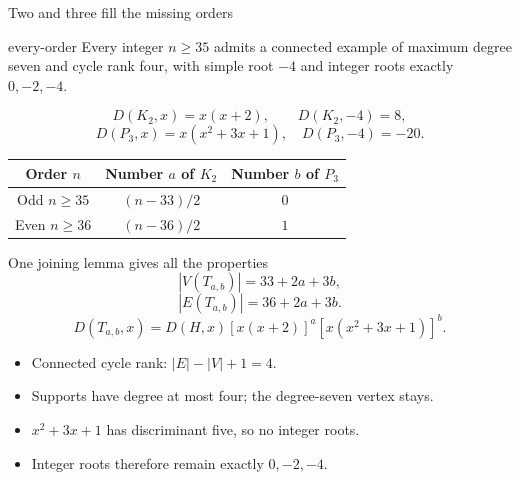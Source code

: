 \documentclass{beamer}
\begin{document}
\begin{frame}{Two and three fill the missing orders}
\begin{bookresult}{every-order}
Every integer $n\geq35$ admits a connected example of maximum degree seven and cycle rank four, with simple root $-4$ and integer roots exactly $0,-2,-4$.
\end{bookresult}
\[D(K_2,x)=x(x+2),\qquad D(K_2,-4)=8,\]
\[D(P_3,x)=x(x^2+3x+1),\quad D(P_3,-4)=-20.\]
\begin{center}\begin{tabular}{c|cc}
Order $n$ & Number $a$ of $K_2$ & Number $b$ of $P_3$\\\hline
Odd $n\geq35$ & $(n-33)/2$ & $0$\\
Even $n\geq36$ & $(n-36)/2$ & $1$
\end{tabular}\end{center}
\end{frame}
\begin{frame}{One joining lemma gives all the properties}
\[|V(T_{a,b})|=33+2a+3b,\]
\[|E(T_{a,b})|=36+2a+3b.\]
\[D(T_{a,b},x)=D(H,x)[x(x+2)]^a[x(x^2+3x+1)]^b.\]
\begin{itemize}
\item Connected cycle rank: $|E|-|V|+1=4$.
\item Supports have degree at most four; the degree-seven vertex stays.
\item $x^2+3x+1$ has discriminant five, so no integer roots.
\item Integer roots therefore remain exactly $0,-2,-4$.
\end{itemize}
\end{frame}
\end{document}
